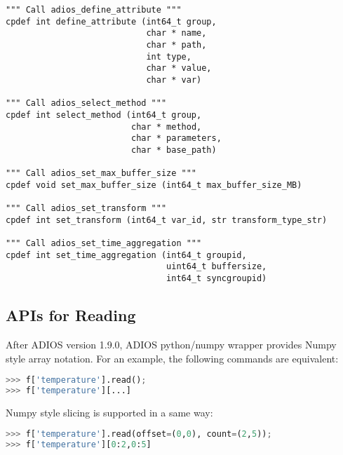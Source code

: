\begin{lstlisting}[language=cython,caption={Functions for writing and No-XML},label={},]
""" Call adios_define_attribute """
cpdef int define_attribute (int64_t group,
                            char * name,
                            char * path,
                            int type,
                            char * value,
                            char * var)

""" Call adios_select_method """
cpdef int select_method (int64_t group,
                         char * method,
                         char * parameters,
                         char * base_path)

""" Call adios_set_max_buffer_size """
cpdef void set_max_buffer_size (int64_t max_buffer_size_MB)

""" Call adios_set_transform """
cpdef int set_transform (int64_t var_id, str transform_type_str)

""" Call adios_set_time_aggregation """
cpdef int set_time_aggregation (int64_t groupid,
                                uint64_t buffersize,
                                int64_t syncgroupid)

\end{lstlisting}

\subsection{APIs for Reading}
After ADIOS version 1.9.0, ADIOS python/numpy wrapper provides Numpy style array notation. For an example, the following commands are equivalent:
\begin{lstlisting}[language=Python,caption={Numpy style reading},label={},]
>>> f['temperature'].read(); 
>>> f['temperature'][...]
\end{lstlisting}

Numpy style slicing is supported in a same way:
\begin{lstlisting}[language=Python,caption={Numpy style slicing},label={},]
>>> f['temperature'].read(offset=(0,0), count=(2,5)); 
>>> f['temperature'][0:2,0:5]
\end{lstlisting}

